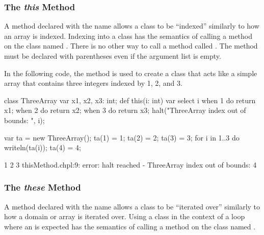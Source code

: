 \subsubsection{The {\em this} Method}
\label{The_em_this_Method}

A method declared with the name  allows a class to be
``indexed'' similarly to how an array is indexed.  Indexing into a
class has the semantics of calling a method on the class
named .  There is no other way to call a method
called .  The  method must be declared with
parentheses even if the argument list is empty.

\begin{example}
In the following code, the  method is used to create a
class that acts like a simple array that contains three integers
indexed by 1, 2, and 3.
\begin{chapelpre}
\end{chapelpre}
\begin{chapel}
class ThreeArray {
  var x1, x2, x3: int;
  def this(i: int) var {
    select i {
      when 1 do return x1;
      when 2 do return x2;
      when 3 do return x3;
    }
    halt("ThreeArray index out of bounds: ", i);
  }
}
\end{chapel}
\begin{chapelpost}
var ta = new ThreeArray();
ta(1) = 1;
ta(2) = 2;
ta(3) = 3;
for i in 1..3 do
  writeln(ta(i));
ta(4) = 4;
\end{chapelpost}
\begin{chapeloutput}
1
2
3
thisMethod.chpl:9: error: halt reached - ThreeArray index out of bounds: 4
\end{chapeloutput}
\end{example}

\subsubsection{The {\em these} Method}
\label{The_these_Method}

A method declared with the name  allows a class to be
``iterated over'' similarly to how a domain or array is iterated over.
Using a class in the context of a loop where
an  is expected has the semantics of calling
a method on the class named .

